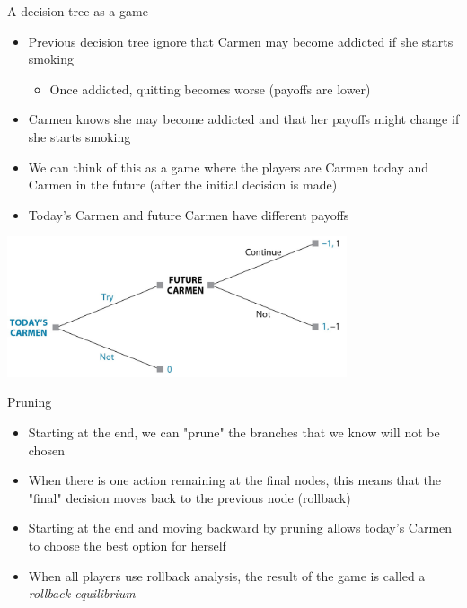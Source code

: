 \documentclass[10pt]{beamer}
\begin{document}
\begin{frame}[label={sec:orgd8673fa}]{}
\alert{A decision tree as a game}
\begin{itemize}
\item Previous decision tree ignore that Carmen may become addicted if she starts smoking
\begin{itemize}
\item Once addicted, quitting becomes worse (payoffs are lower)
\end{itemize}
\item Carmen knows she may become addicted and that her payoffs might change if she starts smoking
\item We can think of this as a game where the players are Carmen today and Carmen in the future (after the initial decision is made)
\item Today's Carmen and future Carmen have different payoffs
\end{itemize}
\end{frame}

\begin{frame}[label={sec:org792c1c4}]{}
\begin{center}
\includegraphics[width=0.75\textwidth]{./img/GAMES4_FIG03.03.jpg}
\end{center}
\end{frame}

\begin{frame}[label={sec:org1cbdef0}]{}
\alert{Pruning}
\begin{itemize}
\item Starting at the end, we can "prune" the branches that we know will not be chosen
\item When there is one action remaining at the final nodes, this means that the "final" decision moves back to the previous node (rollback)
\item Starting at the end and moving backward by pruning allows today's Carmen to choose the best option for herself
\item When all players use rollback analysis, the result of the game is called a \emph{rollback equilibrium}
\end{itemize}
\end{frame}
\end{document}
